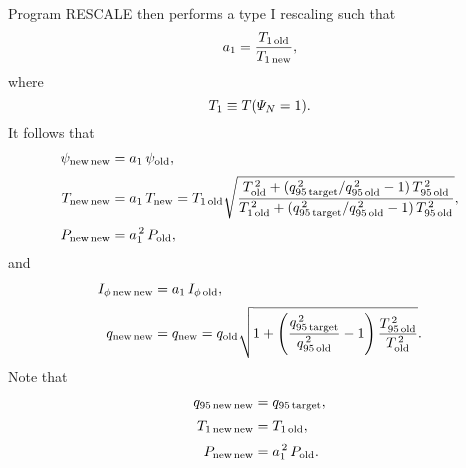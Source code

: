 \documentclass[12pt]{article}
\begin{document}
Program {\sc RESCALE} then performs a type I rescaling such that 
\begin{equation}
a_1 = \frac{T_{1\,{\rm old}}}{T_{1\,{\rm new}}},
\end{equation}
where 
\begin{equation}
T_{1}\equiv  T({\mit\Psi}_N=1).
\end{equation}
It follows that 
\begin{align}
\psi_{\rm new\,new} &= a_1\,\psi_{\rm old},\\[0.5ex]
T_{\rm new\,new} &=a_1\,T_{\rm new} = T_{1\,{\rm old}}
\sqrt{
\frac{T_{\rm old}^{\,2} + (q_{95\,{\rm target}}^{\,2}/q_{95\,{\rm old}}^{\,2}-1)\,T_{95\,{\rm old}}^{\,2}}
{T_{1\,{\rm old}}^{\,2} + (q_{95\,{\rm target}}^{\,2}/q_{95\,{\rm old}}^{\,2}-1)\,T_{95\,{\rm old}}^{\,2}}
},
\\[0.5ex]
P_{\rm new\,new} &=a_1^{\,2}\,P_{\rm old},
\end{align}
and
\begin{align}
I_{\phi\,{\rm new\,new}} &= a_1\,I_{\phi\,{\rm old}},\\[0.5ex]
q_{\rm new\,new} &= q_{\rm new}= q_{\rm old}\sqrt{1 +\left(\frac{q_{95\,{\rm target}}^{\,2}}{q_{95\,{\rm old}}^{\,2}}-1\right)\frac{T_{95\,{\rm old}}^{\,2}}{T_{\rm old}^{\,2}}}.
\end{align}
Note that
\begin{align}
q_{95\,{\rm new\,new}} &= q_{95\,{\rm target}},\\[0.5ex]
T_{1\,{\rm new\,new}} &= T_{1\,{\rm old}},\\[0.5ex]
P_{\rm new\,new} &=a_1^{\,2}\,P_{\rm old}.
\end{align}
\end{document}
